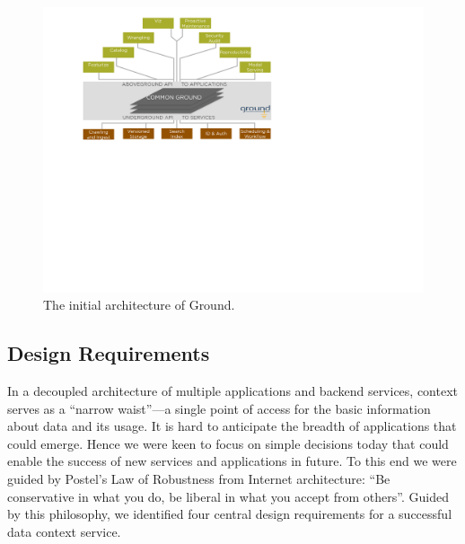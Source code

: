 \documentclass{sig-alternate}
\begin{document}






\begin{figure}[t]
\centering
\includegraphics[width=0.75\linewidth]{groundarch.pdf}
\caption{The initial architecture of Ground.}
\label{fig:arch}
\end{figure}

\subsection{Design Requirements}
In a decoupled architecture of multiple applications and backend services, context serves as a ``narrow waist''---a single point of access for the basic information about data and its usage. It is hard to anticipate the breadth of applications that could emerge.
Hence we were keen to focus on simple decisions today that could enable the success of new services and applications in future. 
To this end we were guided by Postel's Law of Robustness from Internet architecture: ``Be conservative in what you do, be liberal in what you accept from others''.  
Guided by this philosophy, we identified four central design requirements for a successful data context service.
\end{document}
